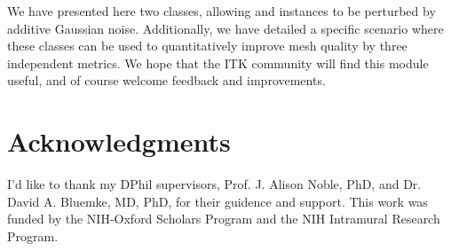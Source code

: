 \documentclass{InsightArticle}
\begin{document}
We have presented here two classes, allowing  and  instances to be perturbed by additive Gaussian noise.  Additionally, we have detailed a specific scenario where these classes can be used to quantitatively improve mesh quality by three independent metrics.  We hope that the ITK community will find this module useful, and of course welcome feedback and improvements.

\section*{Acknowledgments}

I'd like to thank my DPhil supervisors, Prof. J. Alison Noble, PhD, and Dr. David A. Bluemke, MD, PhD, for their guidence and support.  This work was funded by the NIH-Oxford Scholars Program and the NIH Intramural Research Program.
\end{document}
